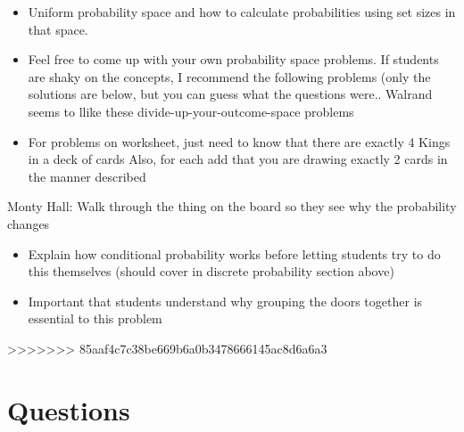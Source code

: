 \documentclass{exam}
\begin{document}
\begin{questions}
\begin{itemize}
      \item Uniform probability space and how to calculate probabilities using set sizes in that space.
      \item Feel free to come up with your own probability space problems. If students are shaky on the concepts, I recommend the following problems (only the solutions are below, but you can guess what the questions were.. Walrand seems to llike these divide-up-your-outcome-space problems
      \item For problems on worksheet, just need to know that there are exactly 4 Kings in a deck of cards
            Also, for each add that you are drawing exactly 2 cards in the manner described
    \end{itemize}
  \item Monty Hall: Walk through the thing on the board so they see why the probability changes
    \begin{itemize}
      \item Explain how conditional probability works before letting students try to do this themselves (should cover in discrete probability section above)
      \item Important that students understand why grouping the doors together is essential to this problem
    \end{itemize}
>>>>>>> 85aaf4c7c38be669b6a0b3478666145ac8d6a6a3
\end{questions}

\section{Questions}
\end{document}
